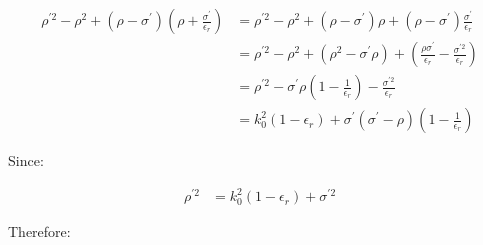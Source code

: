 \documentclass[11pt, oneside]{article}   	%
\begin{document}
\begin{align*}
\rho^{\prime2}-\rho^{2}+\left(\rho-\sigma^{\prime}\right)\left(\rho+\frac{\sigma^{\prime}}{\epsilon_{r}}\right) & =\rho^{\prime2}-\rho^{2}+\left(\rho-\sigma^{\prime}\right)\rho+\left(\rho-\sigma^{\prime}\right)\frac{\sigma^{\prime}}{\epsilon_{r}}\\
 & =\rho^{\prime2}-\rho^{2}+\left(\rho^{2}-\sigma^{\prime}\rho\right)+\left(\frac{\rho\sigma^{\prime}}{\epsilon_{r}}-\frac{\sigma^{\prime2}}{\epsilon_{r}}\right)\\
 & =\rho^{\prime2}-\sigma^{\prime}\rho\left(1-\frac{1}{\epsilon_{r}}\right)-\frac{\sigma^{\prime2}}{\epsilon_{r}}\\
 & =k_{0}^{2}\left(1-\epsilon_{r}\right)+\sigma^{\prime}\left(\sigma^{\prime}-\rho\right)\left(1-\frac{1}{\epsilon_{r}}\right)
\end{align*}


Since: 

\begin{align*}
\rho^{\prime2} & =k_{0}^{2}\left(1-\epsilon_{r}\right)+\sigma^{\prime2}
\end{align*}


Therefore:
\end{document}
